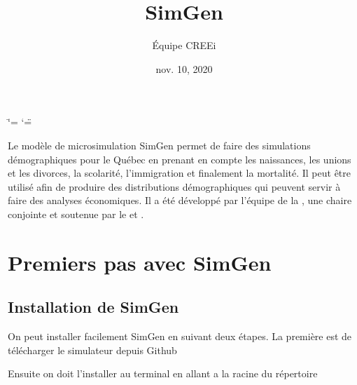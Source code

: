 \documentclass[letterpaper,10pt,french]{sphinxmanual}
\title{SimGen}
\date{nov. 10, 2020}
\author{Équipe CREEi}
\begin{document}
\ifdefined\shorthandoff
  \ifnum\catcode`\=\string=\active\shorthandoff{=}\fi
  \ifnum\catcode`\"=\active{}\fi
\fi

\pagestyle{empty}
\sphinxmaketitle
\pagestyle{plain}
\sphinxtableofcontents
\pagestyle{normal}
\label{\detokenize{index::doc}}


Le modèle de microsimulation SimGen permet de faire des simulations démographiques pour le Québec en prenant en compte les naissances, les unions et les divorces, la scolarité, l’immigration et finalement la mortalité. Il peut être utilisé afin de produire des distributions démographiques qui peuvent servir à faire des analyses économiques. Il a été développé par l’équipe de la , une chaire conjointe  et  soutenue par le  et .


\chapter{Premiers pas avec SimGen}
\label{\detokenize{premierpas:premiers-pas-avec-simgen}}\label{\detokenize{premierpas:premierpas}}\label{\detokenize{premierpas::doc}}

\section{Installation de SimGen}
\label{\detokenize{premierpas:installation-de-simgen}}\label{\detokenize{premierpas:installing-docdir}}
On peut installer facilement SimGen en suivant deux étapes. La première est de télécharger le simulateur depuis Github

\begin{sphinxVerbatim}[commandchars=\\\{\}]
   
\end{sphinxVerbatim}

Ensuite on doit l’installer au terminal en allant a la racine du répertoire 

\begin{sphinxVerbatim}[commandchars=\\\{\}]
  
\end{sphinxVerbatim}
\end{document}
